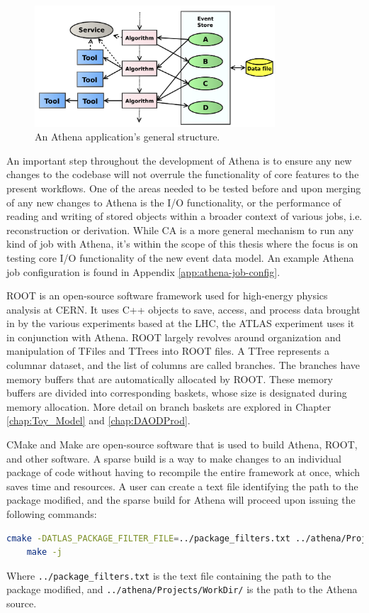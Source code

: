 \begin{figure}[ht]
  \centering
  \includegraphics[width=0.8\textwidth]{content/img/athena job.png}
  \caption{An Athena application's general structure.\cite{Aad:2895022}}
  \label{fig:ATLAS_Athena_Job_flow}
\end{figure}

An important step throughout the development of Athena is to ensure any new changes to the codebase will not overrule the functionality of core features to the present workflows.
One of the areas needed to be tested before and upon merging of any new changes to Athena is the I/O functionality, or the performance of reading and writing of stored objects within a broader context of various jobs, i.e. reconstruction or derivation.
While CA is a more general mechanism to run any kind of job with Athena, it's within the scope of this thesis where the focus is on testing core I/O functionality of the new event data model. 
An example Athena job configuration is found in Appendix \ref{app:athena-job-config}. 

ROOT is an open-source software framework used for high-energy physics analysis at CERN.\cite{ROOT_about} 
It uses C++ objects to save, access, and process data brought in by the various experiments based at the LHC, the ATLAS experiment uses it in conjunction with Athena.
ROOT largely revolves around organization and manipulation of TFiles and TTrees into ROOT files.
A TTree represents a columnar dataset, and the list of columns are called branches. 
The branches have memory buffers that are automatically allocated by ROOT. 
These memory buffers are divided into corresponding baskets, whose size is designated during memory allocation.
More detail on branch baskets are explored in Chapter \ref{chap:Toy_Model} and \ref{chap:DAODProd}.

CMake and Make are open-source software that is used to build Athena, ROOT, and other software.
A sparse build is a way to make changes to an individual package of code without having to recompile the entire framework at once, which saves time and resources. 
A user can create a text file identifying the path to the package modified, and the sparse build for Athena will proceed upon issuing the following commands:
\begin{lstlisting}[language=bash]
    cmake -DATLAS_PACKAGE_FILTER_FILE=../package_filters.txt ../athena/Projects/WorkDir/ 
    make -j
\end{lstlisting}
Where \verb|../package_filters.txt| is the text file containing the path to the package modified, and \verb|../athena/Projects/WorkDir/| is the path to the Athena source.


